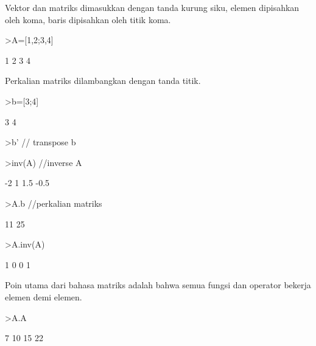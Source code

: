 \documentclass{article}
\newenvironment{eulernotebook}{\par}{\par}
\newenvironment{eulercomment}{\par\medskip}{\par\medskip}
\begin{document}
\begin{eulernotebook}
\begin{eulercomment}
\begin{eulercomment}
\begin{eulercomment}
\begin{eulercomment}
\begin{eulercomment}
Vektor dan matriks dimasukkan dengan tanda kurung siku, elemen
dipisahkan oleh koma, baris dipisahkan oleh titik koma.
\end{eulercomment}
\begin{eulerprompt}
>A=[1,2;3,4]
\end{eulerprompt}
\begin{euleroutput}
              1             2 
              3             4 
\end{euleroutput}
\begin{eulercomment}
Perkalian matriks dilambangkan dengan tanda titik.
\end{eulercomment}
\begin{eulerprompt}
>b=[3;4]
\end{eulerprompt}
\begin{euleroutput}
              3 
              4 
\end{euleroutput}
\begin{eulerprompt}
>b' // transpose b
\end{eulerprompt}
\begin{euleroutput}
  [3,  4]
\end{euleroutput}
\begin{eulerprompt}
>inv(A) //inverse A
\end{eulerprompt}
\begin{euleroutput}
             -2             1 
            1.5          -0.5 
\end{euleroutput}
\begin{eulerprompt}
>A.b //perkalian matriks
\end{eulerprompt}
\begin{euleroutput}
             11 
             25 
\end{euleroutput}
\begin{eulerprompt}
>A.inv(A)
\end{eulerprompt}
\begin{euleroutput}
              1             0 
              0             1 
\end{euleroutput}
\begin{eulercomment}
Poin utama dari bahasa matriks adalah bahwa semua fungsi dan operator
bekerja elemen demi elemen.
\end{eulercomment}
\begin{eulerprompt}
>A.A
\end{eulerprompt}
\begin{euleroutput}
              7            10 
             15            22 
\end{euleroutput}

\end{eulercomment}
\end{eulercomment}
\end{eulercomment}
\end{eulercomment}
\end{eulernotebook}
\end{document}
